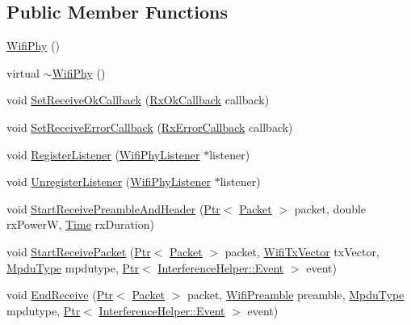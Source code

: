 \subsection*{Public Member Functions}
\begin{DoxyCompactItemize}
\item 
\hyperlink{classns3_1_1WifiPhy_af11e50617477d1ce0069512d7433ceaa}{Wifi\+Phy} ()
\item 
virtual \hyperlink{classns3_1_1WifiPhy_a117dbda5952ef046310797e5480f553c}{$\sim$\+Wifi\+Phy} ()
\item 
void \hyperlink{classns3_1_1WifiPhy_adc3aa3a59f36e5c84f8d759bb15a5bf0}{Set\+Receive\+Ok\+Callback} (\hyperlink{classns3_1_1WifiPhy_a8fc4f4e9b9bd7ef70dd8b050ae2e3188}{Rx\+Ok\+Callback} callback)
\item 
void \hyperlink{classns3_1_1WifiPhy_a50d71b88c866ecfc18cd4006f1a9d2ae}{Set\+Receive\+Error\+Callback} (\hyperlink{classns3_1_1WifiPhy_af6e035a7c603eec7eae9b9365b13742e}{Rx\+Error\+Callback} callback)
\item 
void \hyperlink{classns3_1_1WifiPhy_accee79baeb6d9dbf80cf5711d81fc035}{Register\+Listener} (\hyperlink{classns3_1_1WifiPhyListener}{Wifi\+Phy\+Listener} $\ast$listener)
\item 
void \hyperlink{classns3_1_1WifiPhy_ab46c39e0c4b9f27dea418d6a34ce6606}{Unregister\+Listener} (\hyperlink{classns3_1_1WifiPhyListener}{Wifi\+Phy\+Listener} $\ast$listener)
\item 
void \hyperlink{classns3_1_1WifiPhy_a3a6e284a02ba090313098f1713a579e4}{Start\+Receive\+Preamble\+And\+Header} (\hyperlink{classns3_1_1Ptr}{Ptr}$<$ \hyperlink{classns3_1_1Packet}{Packet} $>$ packet, double rx\+PowerW, \hyperlink{classns3_1_1Time}{Time} rx\+Duration)
\item 
void \hyperlink{classns3_1_1WifiPhy_acde1de1fddf656f4591281fcbe7dc905}{Start\+Receive\+Packet} (\hyperlink{classns3_1_1Ptr}{Ptr}$<$ \hyperlink{classns3_1_1Packet}{Packet} $>$ packet, \hyperlink{classns3_1_1WifiTxVector}{Wifi\+Tx\+Vector} tx\+Vector, \hyperlink{namespacens3_ae617d41bbd0c07fa58ee2306f687b055}{Mpdu\+Type} mpdutype, \hyperlink{classns3_1_1Ptr}{Ptr}$<$ \hyperlink{classns3_1_1InterferenceHelper_1_1Event}{Interference\+Helper\+::\+Event} $>$ event)
\item 
void \hyperlink{classns3_1_1WifiPhy_a79e13682be1a7ee7e2c6131fb6335f25}{End\+Receive} (\hyperlink{classns3_1_1Ptr}{Ptr}$<$ \hyperlink{classns3_1_1Packet}{Packet} $>$ packet, \hyperlink{group__wifi_ga5e94a56cb338a14ffbbb19c6a41251eb}{Wifi\+Preamble} preamble, \hyperlink{namespacens3_ae617d41bbd0c07fa58ee2306f687b055}{Mpdu\+Type} mpdutype, \hyperlink{classns3_1_1Ptr}{Ptr}$<$ \hyperlink{classns3_1_1InterferenceHelper_1_1Event}{Interference\+Helper\+::\+Event} $>$ event)

\end{DoxyCompactItemize}
